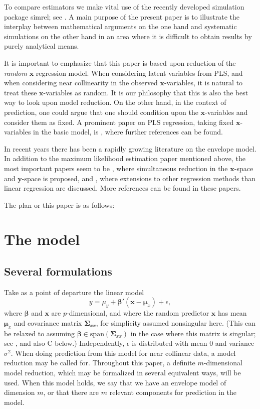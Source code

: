 \documentclass[a4paper, 11pt]{article}
\begin{document}
To compare estimators we make vital use of the recently developed simulation
package simrel; see \citet{saebo2015simrel}. A main purpose of the present paper
is to illustrate the interplay between mathematical arguments on the one hand
and systematic simulations on the other hand in an area where it is difficult to
obtain results by purely analytical means.

It is important to emphasize that this paper is based upon reduction of the
\emph{random} $\bm{x}$ regression model. When considering latent variables from
PLS, and when considering near collinearity in the observed $\bm{x}$-variables,
it is natural to treat these $\bm{x}$-variables as random. It is our philosophy
that this is also the best way to look upon model reduction. On the other hand,
in the context of prediction, one could argue that one should condition upon the
$\bm{x}$-variables and consider them as fixed. A prominent paper on PLS
regression, taking fixed $\bm{x}$-variables in the basic model, is
\citet{kramer2012degrees}, where further references can be found.

In recent years there has been a rapidly growing literature on the envelope
model. In addition to the maximum likelihood estimation paper mentioned above,
the most important papers seem to be \citet{cook2015simultaneous}, where
simultaneous reduction in the $\bm{x}$-space and $\bm{y}$-space is proposed, and
\citet{cook2015foundations}, where extensions to other regression methods than
linear regression are discussed. More references can be found in these papers.

The plan or this paper is as follows:

\section{The model}

\subsection{Several formulations}

Take as a point of departure the linear model
\begin{equation}
  \label{model}
  y=\mu_{y}+\bm{\beta}'(\bm{x}-\bm{\mu}_{x})+\epsilon,
\end{equation}
where $\bm{\beta}$ and $\bm{x}$ are $p$-dimensional, and where the random predictor $\bm{x}$ has mean $\bm{\mu}_{x}$ and covariance matrix $\bm{\Sigma}_{xx}$, for simplicity assumed nonsingular here. (This can be relaxed to assuming $\bm{\beta}\in\mathrm{span}(\bm{\Sigma}_{xx})$ in the case where this matrix is singular; see \citet{cook2013envelopes}, and also C below.) Independently, $\epsilon$ is distributed with mean $0$ and variance $\sigma^2$. When doing prediction from this model for near collinear data, a model reduction may be called for. Throughout this paper, a definite $m$-dimensional model reduction, which may be formalized in several equivalent ways, will be used. When this model holds, we say that we have an envelope model of dimension $m$, or that there are $m$ relevant components for prediction in the model.
\smallskip
\end{document}
